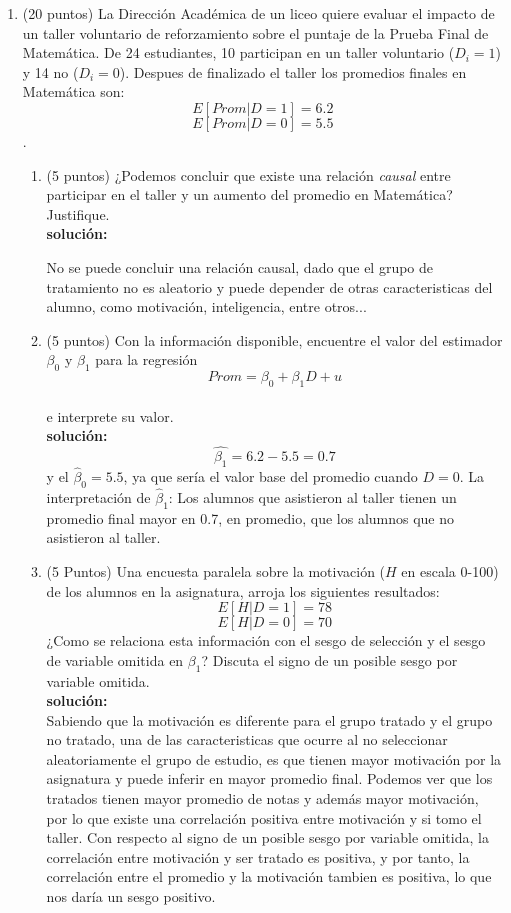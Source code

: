 \documentclass[10pt,a4paper]{article}
\begin{document}
\begin{enumerate}
    \item (20 puntos) La Dirección Académica de un liceo quiere evaluar el impacto de un taller voluntario de reforzamiento sobre el puntaje de la Prueba Final de Matemática. De 24 estudiantes, 10 participan en un taller voluntario ($D_i=1$) y 14 no ($D_i=0$). Despues de finalizado el taller los promedios finales en Matemática son:
    $$ E[Prom|D=1]=6.2$$
    $$E[Prom|D=0]=5.5$$.

\begin{enumerate}
    \item  (5 puntos) ¿Podemos concluir que existe una relación \textit{causal} entre participar en el taller y un aumento del promedio en Matemática? Justifique. \\

    \textbf{solución:}

    No se puede concluir una relación causal, dado que el grupo de tratamiento no es aleatorio y puede depender de otras caracteristicas del alumno, como motivación, inteligencia, entre otros... \\

    \item  (5 puntos) Con la información disponible, encuentre el valor del estimador $\beta_0$ y $\beta_1$ para la regresión
    $$Prom = \beta_0 + \beta_1 D + u$$\\
 e interprete su valor.\\
   \textbf{solución:}
   \\ 
   $$\hat{\beta_1} = 6.2-5.5 = 0.7$$
   y el $\hat{\beta}_0 = 5.5$, ya que sería el valor base del promedio cuando $D=0$. La interpretación de $\hat{\beta}_1$: 
   Los alumnos que asistieron al taller tienen un promedio final mayor en 0.7, en promedio, que los alumnos que no asistieron al taller. 

    \item (5 Puntos) Una encuesta paralela sobre la motivación ($H$ en escala 0-100) de los alumnos en la asignatura, arroja los siguientes resultados:
    $$E[H|D=1]=78$$
    $$E[H|D=0]=70$$
    ¿Como se relaciona esta información con el sesgo de selección y el sesgo de variable omitida en $\beta_1$? Discuta el signo de un posible sesgo por variable omitida.
\\
   \textbf{solución:}
   \\ 
   Sabiendo que la motivación es diferente para el grupo tratado y el grupo no tratado, una de las caracteristicas que ocurre al no seleccionar aleatoriamente el grupo de estudio, es que tienen mayor motivación por la asignatura y puede inferir en mayor promedio final. Podemos ver que los tratados tienen mayor promedio de notas y además mayor motivación, por lo que existe una correlación positiva entre motivación y si tomo el taller.
Con respecto al signo de un posible sesgo por variable omitida, la correlación entre motivación y ser tratado es positiva, y por tanto, la correlación entre el promedio y la motivación tambien es positiva, lo que nos daría un sesgo positivo.


\end{enumerate}
\end{enumerate}
\end{document}
